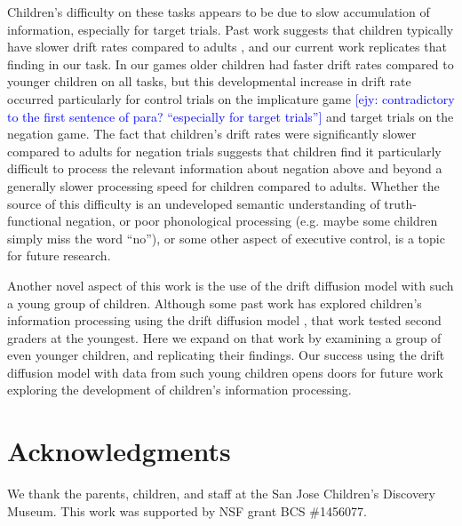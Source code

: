 \documentclass[10pt,letterpaper]{article}
\newcommand{\ejy}[1]{\textcolor{Blue}{[ejy: #1]}}
\begin{document}
Children's difficulty on these tasks appears to be due to slow accumulation of information, especially for target trials.  Past work suggests that children typically have slower drift rates compared to adults \cite{ratcliff2012}, and our current work replicates that finding in our task.  In our games older children had faster drift rates compared to younger children on all tasks, but this developmental increase in drift rate occurred particularly for control trials on the implicature game \ejy{contradictory to the first sentence of para? ``especially for target trials''} and target trials on the negation game.  The fact that children's drift rates were significantly slower compared to adults for negation trials suggests that children find it particularly difficult to process the relevant information about negation above and beyond a generally slower processing speed for children compared to adults.  Whether the source of this difficulty is an undeveloped semantic understanding of truth-functional negation, or poor phonological processing (e.g. maybe some children simply miss the word ``no''), or some other aspect of executive control, is a topic for future research.  

Another novel aspect of this work is the use of the drift diffusion model with such a young group of children.  Although some past work has explored children's information processing using the drift diffusion model \cite{ratcliff2012}, that work tested second graders at the youngest.  Here we expand on that work by examining a group of even younger children, and replicating their findings.  Our success using the drift diffusion model with data from such young children opens doors for future work exploring the development of children's information processing.

\section{Acknowledgments}
%
We thank the parents, children, and staff at the San Jose Children's Discovery Museum. This work was supported by NSF grant BCS \#1456077. 




\setlength{\bibleftmargin}{.125in}
\setlength{\bibindent}{-\bibleftmargin}


\end{document}

